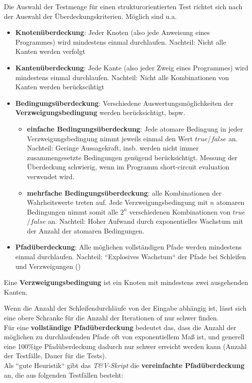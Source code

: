 \noindent
Die Auswahl der Testmenge für einen strukturorientierten Test richtet sich nach der Auswahl der Überdeckungskriterien.
Möglich sind u.a.

\begin{itemize}
    \item \textbf{Knotenüberdeckung}: Jeder Knoten (also jede Anweisung eines Programmes) wird mindestens einmal durchlaufen. Nachteil: Nicht alle Kanten werden verfolgt
    \item \textbf{Kantenüberdeckung}: Jede Kante (also jeder Zweig eines Programmes) wird mindestens einmal durchlaufen. Nachteil: Nicht alle Kombinationen von Kanten werden berückscihtigt
    \item \textbf{Bedingungsüberdeckung}: Verschiedene Auswertungsmöglichkeiten der \textbf{Verzweigungsbedingung} werden berücksichtigt, bspw.
    \begin{itemize}
        \item \textbf{einfache Bedingungsüberdeckung}: Jede atomare Bedingung in jeder Verzweigungsbedingung nimmt jeweils einmal den Wert $true$/$false$ an. Nachteil: Geringe Aussagekraft, insb. werden nicht immer zusammengesetzte Bedingungen genügend berücksichtigt. Messung der Überdeckung schwierig, wenn im Programm short-circuit evaluation verwendet wird.
        \item \textbf{mehrfache Bedingungsüberdeckung}: alle Kombinationen der Wahrheitswerte treten auf. Jede Verzweigungsbedingung mit $n$ atomaren Bedingungen nimmt somit alle $2^n$ verschiedenen Kombinationen von $true$/$false$ an. Nachteil: Hoher Aufwand durch exponentielles Wachstum mit der Anzahl der atomaren Bedingungen.
    \end{itemize}
    \item \textbf{Pfadüberdeckung}: Alle möglichen vollständigen Pfade werden mindestens einmal durchlaufen. Nachteil: ``Explosives Wachstum`` der Pfade bei Schleifen und Verzweigungen (\cite[406]{Bal97})
\end{itemize}

\vspace{5mm}
\begin{tcolorbox}[title={Verzweigungsbedingung}]
    Eine \textbf{Verzweigungsbedingung} ist ein Knoten mit mindestens zwei ausgehenden Kanten.
\end{tcolorbox}
\vspace{5mm}

\noindent
Wenn die Anzahl der Schleifendurchläufe von der Eingabe abhängig ist, lässt sich eine obere Schranke für die Anzahl der Iterationen of nur schwer finden.\\
Für eine \textbf{vollständige Pfadüberdeckung} bedeutet das, dass die Anzahl der möglichen zu durchlaufenden Pfade oft von exponentiellem Maß ist, und generell eine 100\%ige Pfadüberdeckung dadurch nur schwer erreicht werden kann (Anzahl der Testfälle, Dauer für die Tests).\\
Als ``gute Heuristik`` gibt das \textit{T\&V-Skript} die \textbf{vereinfachte Pfadüberdeckung} an, die aus folgenden Testfällen besteht:

